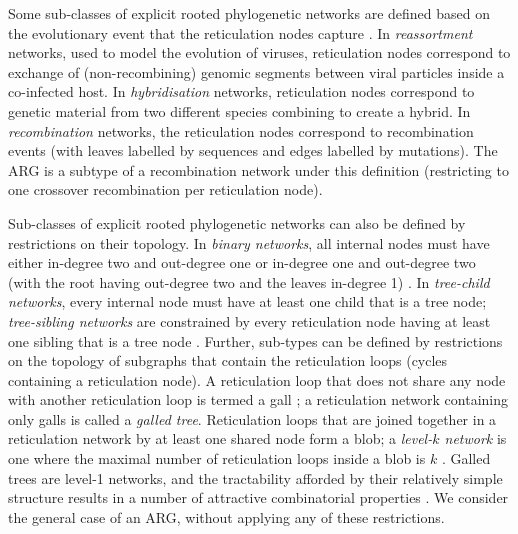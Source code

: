\documentclass{article}
\begin{document}
Some sub-classes of explicit rooted phylogenetic networks are defined based on the evolutionary event that the
reticulation nodes capture \citep{huson2010phylogenetic}. In \emph{reassortment} networks, used to
model the evolution of viruses, reticulation nodes correspond to exchange of
(non-recombining) genomic segments between viral particles inside a co-infected host.
In \emph{hybridisation} networks, reticulation nodes correspond to genetic material from two
different species combining to create a hybrid. In \emph{recombination} networks, the reticulation nodes
correspond to recombination events (with leaves labelled by sequences and edges labelled by mutations).
The ARG is a subtype of a recombination network under this definition (restricting to one crossover
recombination per reticulation node).

Sub-classes of explicit rooted phylogenetic networks can also be defined by restrictions on their topology.
In \emph{binary networks}, all internal nodes must have either in-degree two and out-degree one or in-degree
one and out-degree two (with the root having out-degree two and the leaves in-degree 1) \citep{steel2016phylogeny}.
In \emph{tree-child networks}, every internal node must have at least one child that is a tree node;
\emph{tree-sibling networks} are constrained by every reticulation node having at least one sibling that is a
tree node \citep{cardona2008extended}. Further, sub-types can be defined by restrictions on
the topology of subgraphs that contain the reticulation loops (cycles containing a reticulation node).
A reticulation loop that does not share any node with another reticulation loop is termed a gall
\citep[][p.\ 237]{gusfield2014recombinatorics}; a reticulation network containing only galls is
called a \emph{galled tree}. Reticulation loops that are joined together in a reticulation network
by at least one shared node form a blob; a \emph{level-$k$ network} is one where the maximal number
of reticulation loops inside a blob is $k$ \citep{choy2005computing}. Galled trees are level-1 networks,
and the tractability afforded by their relatively simple structure results in a number of attractive
combinatorial properties \citep{wang2001perfect, gusfield2004optimal}. We consider the general case of
an ARG, without applying any of these restrictions.

\end{document}
